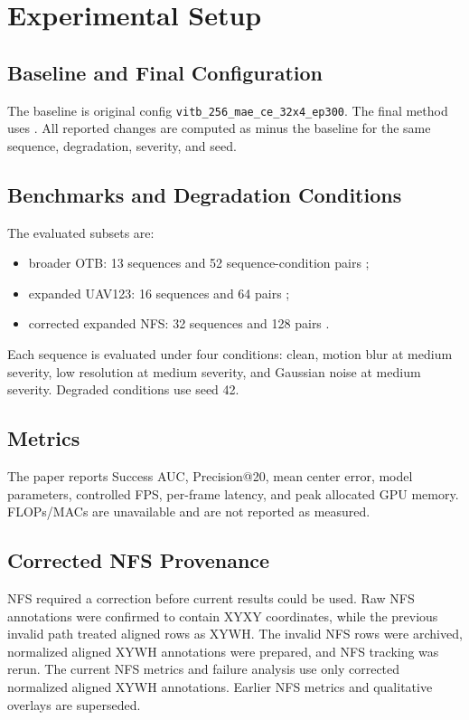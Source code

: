 \section{Experimental Setup}

\subsection{Baseline and Final Configuration}
The baseline is original \baseline{} config \texttt{vitb\_256\_mae\_ce\_32x4\_ep300}. The final method uses \finalconfig{}. All reported changes are computed as \method{} minus the \baseline{} baseline for the same sequence, degradation, severity, and seed.

\subsection{Benchmarks and Degradation Conditions}
The evaluated subsets are:
\begin{itemize}
    \item broader OTB: 13 sequences and 52 sequence-condition pairs ;
    \item expanded UAV123: 16 sequences and 64 pairs ;
    \item corrected expanded NFS: 32 sequences and 128 pairs .
\end{itemize}
Each sequence is evaluated under four conditions: clean, motion blur at medium severity, low resolution at medium severity, and Gaussian noise at medium severity. Degraded conditions use seed 42.

\subsection{Metrics}
The paper reports Success AUC, Precision@20, mean center error, model parameters, controlled FPS, per-frame latency, and peak allocated GPU memory. FLOPs/MACs are unavailable and are not reported as measured.

\subsection{Corrected NFS Provenance}
NFS required a correction before current results could be used. Raw NFS annotations were confirmed to contain XYXY coordinates, while the previous invalid path treated aligned rows as XYWH. The invalid NFS rows were archived, normalized aligned XYWH annotations were prepared, and NFS tracking was rerun. The current NFS metrics and failure analysis use only corrected normalized aligned XYWH annotations. Earlier NFS metrics and qualitative overlays are superseded.
